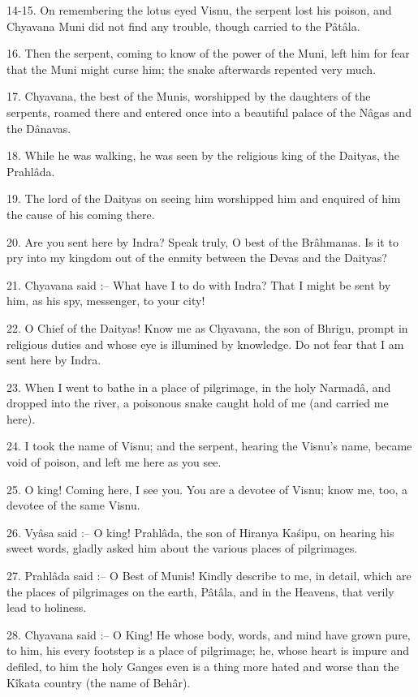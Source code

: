 14-15. On remembering the lotus eyed  Visnu, the serpent lost his poison, and Chyavana Muni did not find any trouble, though carried to the P\^at\^ala.

16. Then the serpent, coming to know of the power of the Muni, left him for fear that the Muni might curse him; the snake afterwards repented very much.

17. Chyavana, the best of the Munis, worshipped by the daughters of the serpents, roamed there and entered once into a beautiful palace of the N\^agas and the D\^anavas.

18. While he was walking, he was seen by the religious king of the Daityas, the Prahl\^ada.

19. The lord of the Daityas on seeing him worshipped him and enquired of him the cause of his coming there.

20. Are you sent here by Indra? Speak truly, O best of the Br\^ahmanas. Is it to pry into my kingdom out of the enmity between the Devas and the Daityas?

21. Chyavana said :-- What have I to do with Indra? That I might be sent by him, as his spy, messenger, to your city!

22. O Chief of the Daityas! Know me as Chyavana, the son of Bhrigu, prompt in religious duties and whose eye is illumined by knowledge. Do not fear that I am sent here by Indra.

23. When I went to bathe in a place of pilgrimage, in the holy Narmad\^a, and dropped into the river, a poisonous snake caught hold of me (and carried me here).

24. I took the name of Visnu; and the serpent, hearing the Visnu's name, became void of poison, and left me here as you see.

25. O king! Coming here, I see you. You are a devotee of Visnu; know me, too, a devotee of the same Visnu.

26. Vy\^asa said :-- O king! Prahl\^ada, the son of Hiranya Ka\'sipu, on hearing his sweet words, gladly asked him about the various places of pilgrimages.

27. Prahl\^ada said :-- O Best of Munis! Kindly describe to me, in detail, which are the places of pilgrimages on the earth, P\^at\^ala, and in the Heavens, that verily lead to holiness.

28. Chyavana said :-- O King! He whose body, words, and mind have grown pure, to him, his every footstep is a place of pilgrimage; he, whose heart is impure and defiled, to him the holy Ganges even is a thing more hated and worse than the K\^ikata country (the name of Beh\^ar).

